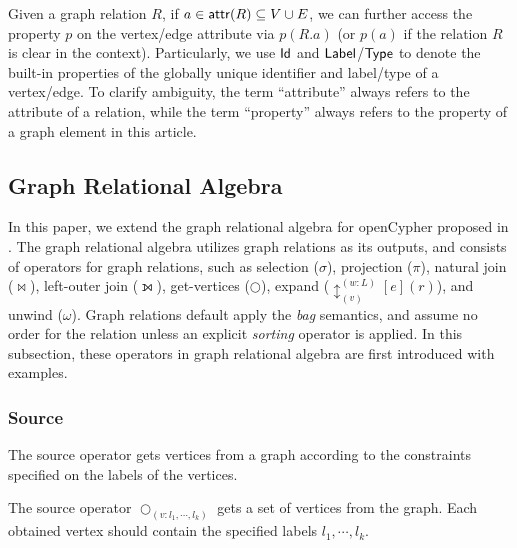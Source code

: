 Given a graph relation $R$, if $a \in {\ensuremath {\mathsf{attr}}}(R) \subseteq V \cup E$, we can further access the property $p$ on the vertex/edge attribute via $p(R.a)$ (or $p(a)$ if the relation $R$ is clear in the context). 
Particularly, we use ${\mathsf{Id}}$ and ${\mathsf{Label}}$/${\mathsf{Type}}$ to denote the built-in properties of the globally unique identifier and label/type of a vertex/edge. 
To clarify ambiguity, the term ``attribute'' always refers to the attribute of a relation, while the term ``property'' always refers to the property of a graph element in this article.


\subsection{Graph Relational Algebra}

In this paper, we extend the graph relational algebra for openCypher proposed in \cite{}.
The graph relational algebra utilizes graph relations as its outputs, and consists of operators for graph relations, such as selection ($\sigma$), projection ($\pi$), natural join ($\Join$), left-outer join ($\leftouterjoin$), get-vertices ($\bigcirc$), expand ($\updownarrow^{(w:L)}_{(v)}[e](r)$), and unwind ($\omega$).
Graph relations default apply the \emph{bag} semantics, and assume no order for the relation unless an explicit \emph{sorting} operator is applied.
In this subsection, these operators in graph relational algebra are first introduced with examples.


\subsubsection{Source}
The source operator gets vertices from a graph according to the constraints specified on the labels of the vertices.

\begin{definition}
    The source operator $\bigcirc_{(v:l_1, \cdots, l_k)}$ gets a set of vertices from the graph.
    Each obtained vertex should contain the specified labels $l_1, \cdots, l_k$.
\end{definition}

